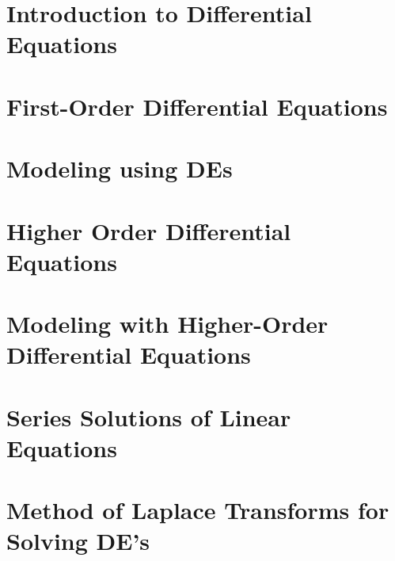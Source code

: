\documentclass[12pt]{report}
\begin{document}
\maketitle
\tableofcontents

\chapter[Introduction to Diff-Eq]{Introduction to Differential Equations}\label{ch:introduction-to-differential-equations}

\chapter{First-Order Differential Equations}\label{ch:first-order-differential-equations}

\chapter{Modeling using DEs}\label{ch:modeling-using-des}

\chapter[Higher Order DE{s}]{Higher Order Differential Equations}\label{ch:higher-order-differential-equations}

\chapter[Modeling with Higher-Order DEs]{Modeling with Higher-Order Differential Equations}\label{ch:modeling-with-higher-order-differential-equations}

\chapter{Series Solutions of Linear Equations}\label{ch:series-solutions-of-linear-equations}

\chapter[The Laplace Transform]{Method of Laplace Transforms for Solving DE's}\label{ch:method-of-laplace-transforms-for-solving-de's}
\end{document}
